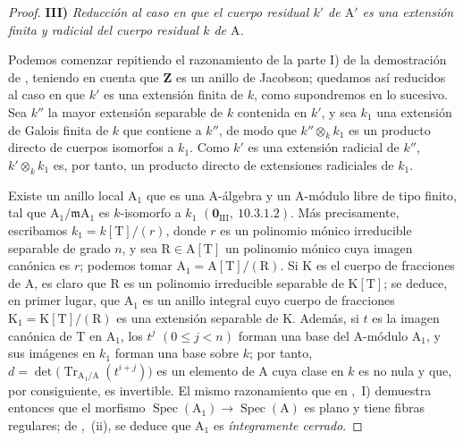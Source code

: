 \begin{proof}
\medskip
\noindent\textbf{III)} \emph{Reducción al caso en que el cuerpo residual $k'$ de $\mathrm{A}'$ es una extensión finita y radicial del
cuerpo residual $k$ de $\mathrm{A}$.}

\medskip
Podemos comenzar repitiendo el razonamiento de la parte I) de la
demostración de , teniendo en cuenta que $\mathbf{Z}$ es un
anillo de Jacobson; quedamos así reducidos al caso en que $k'$ es una extensión finita de $k$, como supondremos en lo sucesivo.
Sea $k''$ la mayor extensión separable de $k$ contenida en $k'$, y sea $k_1$ una extensión de Galois finita de $k$ que contiene a $k''$, de modo que $k''\otimes_k k_1$ es un producto directo de cuerpos isomorfos a $k_1$.
Como $k'$ es una extensión radicial de $k''$, $k'\otimes_k k_1$ es, por tanto, un producto directo de extensiones radiciales de $k_1$.

Existe un anillo local $\mathrm{A}_1$ que es una $\mathrm{A}$-álgebra y un $\mathrm{A}$-módulo libre de tipo finito, tal que $\mathrm{A}_1/\mathfrak{m}\mathrm{A}_1$ es $k$-isomorfo a $k_1$ $(\mathbf{0}_{\mathrm{III}},~10.3.1.2)$.
Más precisamente, escribamos $k_1=k[\mathrm{T}]/(r)$, donde $r$ es un polinomio mónico irreducible separable de grado $n$, y sea $\mathrm{R}\in\mathrm{A}[\mathrm{T}]$ un polinomio mónico cuya imagen canónica es $r$; podemos tomar $\mathrm{A}_1=\mathrm{A}[\mathrm{T}]/(\mathrm{R})$.
Si $\mathrm{K}$ es el cuerpo de fracciones de $\mathrm{A}$, es claro que $\mathrm{R}$ es un polinomio irreducible separable de $\mathrm{K}[\mathrm{T}]$; se deduce, en primer lugar, que $\mathrm{A}_1$ es un anillo integral cuyo cuerpo de fracciones $\mathrm{K}_1=\mathrm{K}[\mathrm{T}]/(\mathrm{R})$ es una extensión separable de $\mathrm{K}$.
Además, si $t$ es la imagen canónica de $\mathrm{T}$ en $\mathrm{A}_1$, los $t^j$ $(0\leq j<n)$ forman una base del $\mathrm{A}$-módulo $\mathrm{A}_1$, y sus imágenes en $k_1$ forman una base sobre $k$; por tanto, $d=\det\bigl(\operatorname{Tr}_{\mathrm{A}_1/\mathrm{A}}(t^{i+j})\bigr)$ es un elemento de $\mathrm{A}$ cuya clase en $k$ es no nula y que, por consiguiente, es invertible.
El mismo razonamiento que en ,~I) demuestra entonces que el morfismo $\operatorname{Spec}(\mathrm{A}_1)\to\operatorname{Spec}(\mathrm{A})$ es plano y tiene fibras regulares; de ,~(ii), se deduce que $\mathrm{A}_1$ es \emph{íntegramente cerrado}.


\end{proof}
